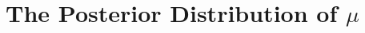 \newcommand{\mux}{\mu_x}
\newcommand{\mumux}{\mu_{\mu_x}}
\newcommand{\mumuxp}{
  \mu'_{\mu_x}
}

\newcommand{\rhomux}{\rho_{\mu_x}}
\newcommand{\rhomuxp}{\rho_{\mu_x}}

\newcommand{\rhox}{\rho_{x}}

\newcommand{\varmux}{\var_{\mu_x}}
\newcommand{\varmuxp}{
  \sigma^{'2}_{\mu_x}
}
\newcommand{\varx}{\var_x}
\newcommand{\pmux}{\pr{\mux}}
\newcommand{\px}{\pr{x}}
\newcommand{\cpmuxx}{\condpr{\mux}{x}}
\newcommand{\cpxmux}{\condpr{x}{\mux}}
\newcommand{\tcpmuxx}{\tcondpr{\mux}{x}}

\newcommand{\sigmax}{\sigma_x}
\newcommand{\sigmamux}{\sigma_{\mux}}
\newcommand{\sigmamuxp}{\sigma'_{\mux}}

\section{The Posterior Distribution of $\mu$}








